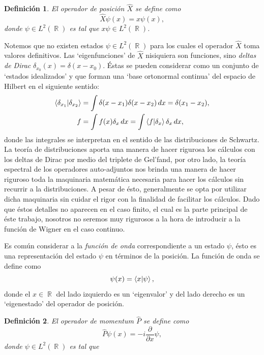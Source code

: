\documentclass[a4paper]{report}
\DeclareMathOperator{\R}{\mathbb{R}}
\newtheorem{definition}{Definición}
\begin{document}
  \begin{definition}
    El operador de posición $\hat X$ se define como
    \[
      \hat X\psi(x) = x\psi(x),
    \] 
    donde $\psi \in L^2(\R)$ es tal que $x\psi \in L^2(\R)$.
  \end{definition}

  Notemos que no existen estados $\psi \in L^2(\R)$ para los
  cuales el operador $\hat X$ toma valores definitivos. Las
  `eigenfunciones' de $\hat X$ nisiquiera son funciones,
  sino \textit{deltas de Dirac} $\delta_{x_0}(x) = \delta(x
  - x_0)$. Éstas se pueden considerar como un conjunto de
  `estados idealizados' y que forman una `base ortonormal
  continua' del espacio de Hilbert en el siguiente sentido:
  \begin{align*}
    \braket{\delta_{x_1}|\delta_{x_2}}
    &= \int \delta(x-x_1)\delta(x-x_2) \, dx
    = \delta(x_1-x_2), \\
    f
    &= \int f(x)\delta_x \, dx
    = \int \braket{f| \delta_x}\delta_x \, dx,
  \end{align*} 
  donde las integrales se interpretan en el sentido de las
  distribuciones de Schwartz. La teoría de distribuciones
  aporta una manera de hacer rigurosa los cálculos con los
  deltas de Dirac por medio del triplete de Gel'fand, por
  otro lado, la teoría espectral de los operadores
  auto-adjuntos nos brinda una manera de hacer riguroso toda
  la maquinaria matemática necesaria para hacer los cálculos
  sin recurrir a la distribuciones. A pesar de ésto,
  generalmente se opta por utilizar dicha maquinaria sin
  cuidar el rigor con la finalidad de facilitar los
  cálculos. Dado que éstos detalles no aparecen en el caso
  finito, el cual es la parte principal de éste trabajo,
  nosotros no seremos muy rigurosos a la hora de introducir
  a la función de Wigner en el caso continuo.

  Es común considerar a la \textit{función de onda}
  correspondiente a un estado $\psi$, ésto es una
  representación del estado $\psi$ en términos de la
  posición. La función de onda se define como
  \[
    \psi(x)
    = \braket{x| \psi},
  \] 
  donde el $x \in \R$ del lado izquierdo es un `eigenvalor'
  y del lado derecho es un `eigenestado' del operador de
  posición. 

  \begin{definition}
    El operador de momentum $\hat P$ se define como
    \[
      \hat P\psi(x) = -i \frac{\partial}{\partial x} \psi,
    \] 
    donde $\psi \in L^2(\R)$ es tal que
  \end{definition}
\end{document}
